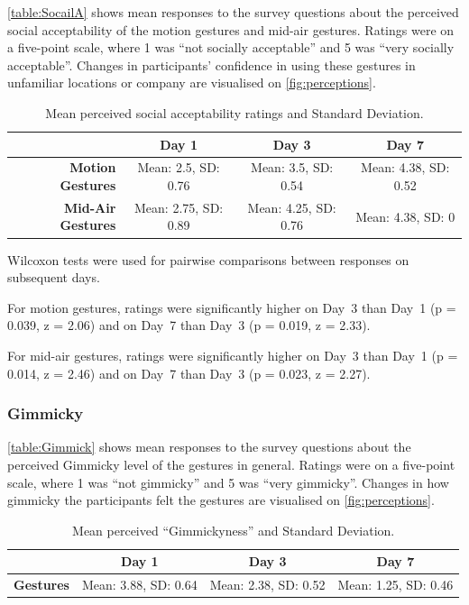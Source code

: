 \documentclass{l4proj}
\begin{document}
\autoref{table:SocailA} shows mean responses to the survey questions about the perceived social acceptability of the motion gestures and mid-air gestures. Ratings were on a five-point scale, where 1 was ``not socially acceptable'' and 5 was ``very socially acceptable''. Changes in participants' confidence in using these gestures in unfamiliar locations or company are visualised on \autoref{fig:perceptions}. 

\begin{table}[h!]
\centering
\begin{tabular}{r c c c}
                              & \textbf{Day 1} & \textbf{Day 3} & \textbf{Day 7} \\ \toprule
    \textbf{Motion Gestures}  & Mean: 2.5, SD: 0.76   & Mean: 3.5, SD: 0.54    & Mean: 4.38, SD: 0.52  \\
    \textbf{Mid-Air Gestures} & Mean: 2.75, SD: 0.89   & Mean: 4.25, SD: 0.76    & Mean: 4.38, SD: 0 \\ \bottomrule
\end{tabular}
\caption{Mean perceived social acceptability ratings and Standard Deviation.}
\label{table:SocailA}
\end{table}

Wilcoxon tests were used for pairwise comparisons between responses on subsequent days.

For motion gestures, ratings were significantly higher on Day~3 than Day~1 (p = 0.039, z = 2.06) and on Day~7 than Day~3 (p = 0.019, z = 2.33).

For mid-air gestures, ratings were significantly higher on Day~3 than Day~1 (p = 0.014, z = 2.46) and on Day~7 than Day~3 (p = 0.023, z = 2.27).

\hfill \break






\subsubsection{Gimmicky}

\autoref{table:Gimmick} shows mean responses to the survey questions about the perceived Gimmicky level of the gestures in general. Ratings were on a five-point scale, where 1 was ``not gimmicky'' and 5 was ``very gimmicky''. Changes in how gimmicky the participants felt the gestures are visualised on \autoref{fig:perceptions}. 

\begin{table}[h!]
\centering
\begin{tabular}{r c c c}
                              & \textbf{Day 1} & \textbf{Day 3} & \textbf{Day 7} \\ \toprule
    \textbf{Gestures}       & Mean: 3.88, SD: 0.64   & Mean: 2.38, SD: 0.52    & Mean: 1.25, SD: 0.46 \\ \bottomrule
\end{tabular}
\caption{Mean perceived ``Gimmickyness'' and Standard Deviation.}
\label{table:Gimmick}
\end{table}
\end{document}
